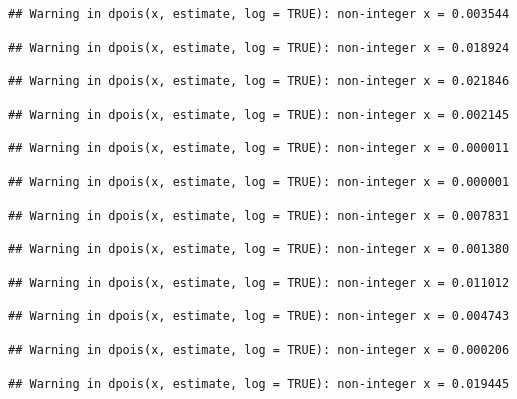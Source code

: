 \documentclass[]{article}
\begin{document}
\begin{verbatim}
## Warning in dpois(x, estimate, log = TRUE): non-integer x = 0.003544
\end{verbatim}

\begin{verbatim}
## Warning in dpois(x, estimate, log = TRUE): non-integer x = 0.018924
\end{verbatim}

\begin{verbatim}
## Warning in dpois(x, estimate, log = TRUE): non-integer x = 0.021846
\end{verbatim}

\begin{verbatim}
## Warning in dpois(x, estimate, log = TRUE): non-integer x = 0.002145
\end{verbatim}

\begin{verbatim}
## Warning in dpois(x, estimate, log = TRUE): non-integer x = 0.000011
\end{verbatim}

\begin{verbatim}
## Warning in dpois(x, estimate, log = TRUE): non-integer x = 0.000001
\end{verbatim}

\begin{verbatim}
## Warning in dpois(x, estimate, log = TRUE): non-integer x = 0.007831
\end{verbatim}

\begin{verbatim}
## Warning in dpois(x, estimate, log = TRUE): non-integer x = 0.001380
\end{verbatim}

\begin{verbatim}
## Warning in dpois(x, estimate, log = TRUE): non-integer x = 0.011012
\end{verbatim}

\begin{verbatim}
## Warning in dpois(x, estimate, log = TRUE): non-integer x = 0.004743
\end{verbatim}

\begin{verbatim}
## Warning in dpois(x, estimate, log = TRUE): non-integer x = 0.000206
\end{verbatim}

\begin{verbatim}
## Warning in dpois(x, estimate, log = TRUE): non-integer x = 0.019445
\end{verbatim}
\end{document}
